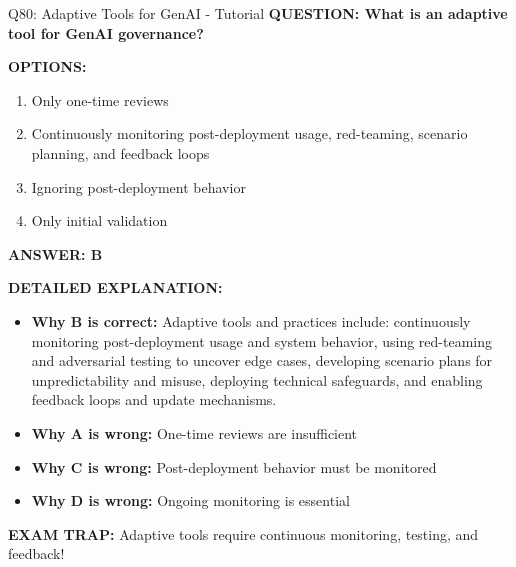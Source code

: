 \documentclass[8pt]{beamer}
\begin{document}
	\begin{frame}{Q80: Adaptive Tools for GenAI - Tutorial}
		\fontsize{6.5}{7.5}\selectfont
		\textbf{QUESTION: What is an adaptive tool for GenAI governance?}
		
		\vspace{0.1cm}
		\textbf{OPTIONS:}
		\begin{enumerate}
			\item Only one-time reviews
			\item Continuously monitoring post-deployment usage, red-teaming, scenario planning, and feedback loops
			\item Ignoring post-deployment behavior
			\item Only initial validation
		\end{enumerate}
		
		\vspace{0.1cm}
		\textcolor{myblue}{\textbf{ANSWER: B}}
		
		\vspace{0.1cm}
		\textbf{DETAILED EXPLANATION:}
		\begin{itemize}
			\item \textbf{Why B is correct:} Adaptive tools and practices include: continuously monitoring post-deployment usage and system behavior, using red-teaming and adversarial testing to uncover edge cases, developing scenario plans for unpredictability and misuse, deploying technical safeguards, and enabling feedback loops and update mechanisms.
			\item \textbf{Why A is wrong:} One-time reviews are insufficient
			\item \textbf{Why C is wrong:} Post-deployment behavior must be monitored
			\item \textbf{Why D is wrong:} Ongoing monitoring is essential
		\end{itemize}
		
		\textcolor{myred}{\textbf{EXAM TRAP:}} Adaptive tools require \textcolor{myblue}{continuous monitoring, testing, and feedback}!
	\end{frame}
	
\end{document}
